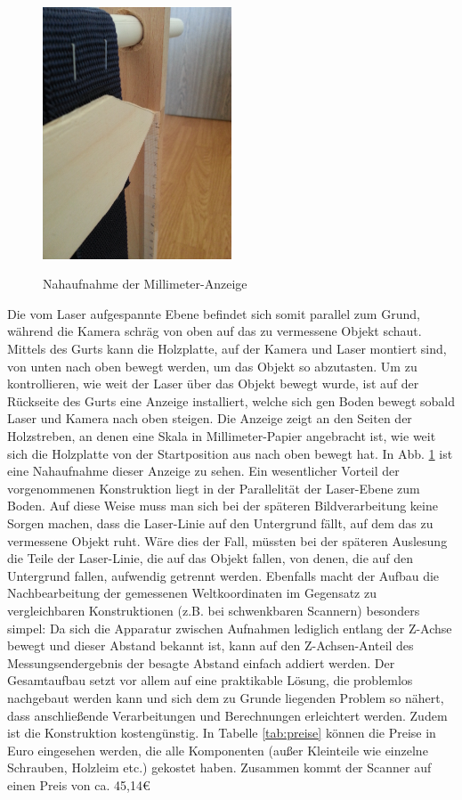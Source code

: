 \begin{figure}
\centering \includegraphics[width=0.5\textwidth, angle = -90]{images/Scanner3.jpg}
\label{fig:scanner3}
\caption{Nahaufnahme der Millimeter-Anzeige}
\end{figure}

\bigbreak
Die vom Laser aufgespannte Ebene befindet sich somit parallel zum Grund, während die Kamera schräg von oben auf das zu vermessene Objekt schaut. Mittels des Gurts kann die Holzplatte, auf der Kamera und Laser montiert sind, von unten nach oben bewegt werden, um das Objekt so abzutasten. Um zu kontrollieren, wie weit der Laser über das Objekt bewegt wurde, ist auf der Rückseite des Gurts eine Anzeige installiert, welche sich gen Boden bewegt sobald Laser und Kamera nach oben steigen. Die Anzeige zeigt an den Seiten der Holzstreben, an denen eine Skala in Millimeter-Papier angebracht ist, wie weit sich die Holzplatte von der Startposition aus nach oben bewegt hat. In Abb. \ref{fig:scanner3} ist eine Nahaufnahme dieser Anzeige zu sehen. \bigbreak
Ein wesentlicher Vorteil der vorgenommenen Konstruktion liegt in der Parallelität der Laser-Ebene zum Boden. Auf diese Weise muss man sich bei der späteren Bildverarbeitung keine Sorgen machen, dass die Laser-Linie auf den Untergrund fällt, auf dem das zu vermessene Objekt ruht. Wäre dies der Fall, müssten bei der späteren Auslesung die Teile der Laser-Linie, die auf das Objekt fallen, von denen, die auf den Untergrund fallen, aufwendig getrennt werden. Ebenfalls macht der Aufbau die Nachbearbeitung der gemessenen Weltkoordinaten im Gegensatz zu vergleichbaren Konstruktionen (z.B. bei schwenkbaren Scannern) besonders simpel: Da sich die Apparatur zwischen Aufnahmen lediglich entlang der Z-Achse bewegt und dieser Abstand bekannt ist, kann auf den Z-Achsen-Anteil des Messungsendergebnis der besagte Abstand einfach addiert werden.\bigbreak
Der Gesamtaufbau setzt vor allem auf eine praktikable Lösung, die problemlos nachgebaut werden kann und sich dem zu Grunde liegenden Problem so nähert, dass anschließende Verarbeitungen und Berechnungen erleichtert werden. Zudem ist die Konstruktion kostengünstig. In Tabelle \ref{tab:preise} können die Preise in Euro eingesehen werden, die alle Komponenten (außer Kleinteile wie einzelne Schrauben, Holzleim etc.) gekostet haben. Zusammen kommt der Scanner auf einen Preis von ca. 45,14\euro

